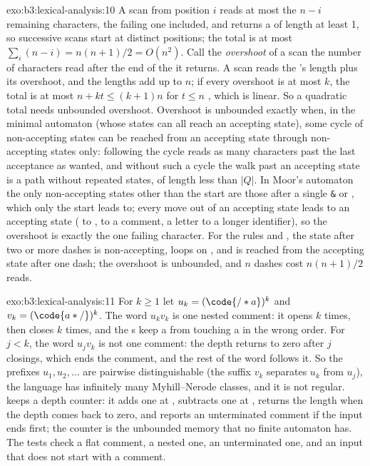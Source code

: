 \begin{solution}{exo:b3:lexical-analysis:10}
A scan from position $i$ reads at most the $n - i$ remaining characters, the failing one included, and returns a  of length at least 1, so successive scans start at distinct positions; the total is at most $\sum_{i}(n - i) = n(n+1)/2 = O(n^2)$. Call the \emph{overshoot} of a scan the number of characters read after the end of the  it returns. A scan reads the 's length plus its overshoot, and the  lengths add up to $n$; if every overshoot is at most $k$, the total is at most $n + k t \le (k + 1)n$ for $t \le n$ , which is linear. So a quadratic total needs unbounded overshoot. Overshoot is unbounded exactly when, in the minimal automaton (whose states can all reach an accepting state), some cycle of non-accepting states can be reached from an accepting state through non-accepting states only: following the cycle reads as many characters past the last acceptance as wanted, and without such a cycle the walk past an accepting state is a path without repeated states, of length less than $|Q|$. In Moor's automaton the only non-accepting states other than the start are those after a single \texttt{\&} or \code{|}, which only the start leads to; every move out of an accepting state leads to an accepting state (\code{<} to \code{<=}, \code{/} to a comment, a letter to a longer identifier), so the overshoot is exactly the one failing character. For the rules \code{-} and \code{-+>}, the state after two or more dashes is non-accepting, loops on \code{-}, and is reached from the accepting state after one dash; the overshoot is unbounded, and $n$ dashes cost $n(n+1)/2$ reads.
\end{solution}

\begin{solution}{exo:b3:lexical-analysis:11}
For $k \ge 1$ let $u_k = (\code{/*a})^k$ and $v_k = (\code{a*/})^k$. The word $u_k v_k$ is one nested comment: it opens $k$ times, then closes $k$ times, and the s keep a \code{*} from touching a \code{/} in the wrong order. For $j < k$, the word $u_j v_k$ is not one comment: the depth returns to zero after $j$ closings, which ends the comment, and the rest of the word follows it. So the prefixes $u_1, u_2, \dots$ are pairwise distinguishable (the suffix $v_k$ separates $u_k$ from $u_j$), the language has infinitely many Myhill--Nerode classes, and it is not regular.  keeps a depth counter: it adds one at \code{/*}, subtracts one at \code{*/}, returns the length when the depth comes back to zero, and reports an unterminated comment if the input ends first; the counter is the unbounded memory that no finite automaton has. The tests check a flat comment, a nested one, an unterminated one, and an input that does not start with a comment.
\end{solution}

